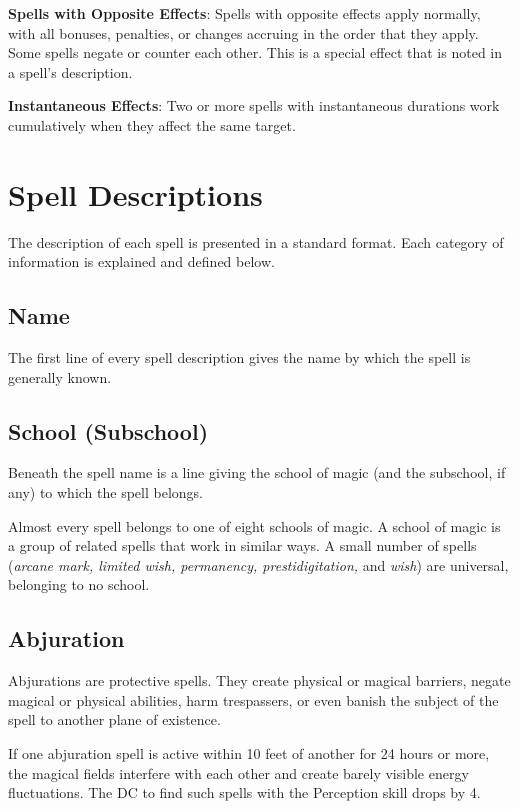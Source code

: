 \textbf{Spells with Opposite Effects}: Spells with opposite effects apply normally, with all bonuses, penalties, or changes accruing in the order that they apply. Some spells negate or counter each other. This is a special effect that is noted in a spell's description. 
				
\textbf{Instantaneous Effects}: Two or more spells with instantaneous durations work cumulatively when they affect the same target.
				
\section{Spell Descriptions}

				
The description of each spell is presented in a standard format. Each category of information is explained and defined below.
				
\subsection{Name}

				
The first line of every spell description gives the name by which the spell is generally known.
				
\subsection{School (Subschool)}

				
Beneath the spell name is a line giving the school of magic (and the subschool, if any) to which the spell belongs.
				
Almost every spell belongs to one of eight schools of magic. A school of magic is a group of related spells that work in similar ways. A small number of spells (\textit{arcane mark, limited wish, permanency, prestidigitation, }and \textit{wish}) are universal, belonging to no school.
				
\subsection{Abjuration}

				
Abjurations are protective spells. They create physical or magical barriers, negate magical or physical abilities, harm trespassers, or even banish the subject of the spell to another plane of existence. 
				
If one abjuration spell is active within 10 feet of another for 24 hours or more, the magical fields interfere with each other and create barely visible energy fluctuations. The DC to find such spells with the Perception skill drops by 4.
				
